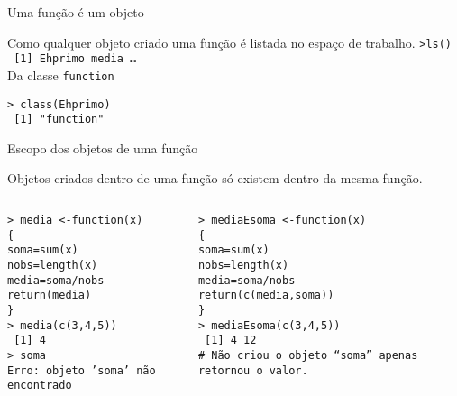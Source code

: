 \documentclass[handout]{beamer}
\begin{document}
\begin{frame}{Uma função é um objeto}

Como qualquer objeto criado uma função é listada no espaço de trabalho.
\texttt{>ls()\\
~[1] Ehprimo media  \dots}\\ \vspace{10pt}
\pause Da classe \texttt{function}

\texttt{> class(Ehprimo)\\
~[1] "function"}
  
\end{frame}

\begin{frame}{Escopo dos objetos de uma função}

Objetos criados dentro de uma função só existem dentro da mesma função. 

\begin{columns}
  \begin{column}{6cm}
    \texttt{> media <-function(x)\\
      \hspace{30pt} \{\\
      \hspace{30pt} soma=sum(x)\\
      \hspace{30pt} nobs=length(x)\\
      \hspace{30pt} media=soma/nobs\\
      \hspace{30pt} return(media)\\
      \hspace{30pt}\} \\
      > media(c(3,4,5))\\
      ~[1] 4 \\
      > soma\\
      Erro: objeto 'soma' não encontrado} \pause
  \end{column}

  \begin{column}{6cm}
    \texttt{> mediaEsoma <-function(x)\\
      \hspace{30pt} \{\\
      \hspace{30pt} soma=sum(x)\\
      \hspace{30pt} nobs=length(x)\\
      \hspace{30pt} media=soma/nobs\\
      \hspace{30pt} return(c(media,soma))\\
      \hspace{30pt}\} \\
      > mediaEsoma(c(3,4,5))\\
      ~[1]  4 12\\
 \# Não criou o objeto ``soma'' apenas retornou o valor.}
   
  \end{column}
\end{columns}
\end{frame}
\end{document}
